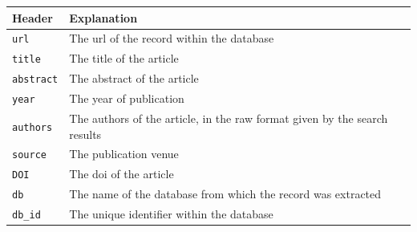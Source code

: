 \begin{tabularx}{\textwidth}{lX}
\toprule
Header & Explanation \\
\midrule
\verb|url| & The \gls{url} of the record within the database \\
\verb|title| & The title of the article \\
\verb|abstract| & The abstract of the article \\
\verb|year| & The year of publication \\
\verb|authors| & The authors of the article, in the raw format given by the search results \\
\verb|source| & The publication venue \\
\verb|DOI| & The \gls{doi} of the article \\
\verb|db| & The name of the database from which the record was extracted \\
\verb|db_id| & The unique identifier within the database \\
\bottomrule
\end{tabularx}
